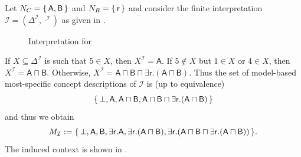 \begin{Example}
  \label{expl:no-minimality}
  Let $N_C = {\{\, \mathsf{A}, \mathsf{B} \,\}}$ and $N_R = {\{\, \mathsf{r} \,\}}$ and consider
  the finite interpretation $\mathcal{I} = (\Delta^{\mathcal{I}}, \cdot^{\mathcal{I}})$ as
  given in .

  \begin{figure}[tp]
    \centering
    \caption{Interpretation for }
    \label{fig:no-minimality}
  \end{figure}

  If $X \subseteq \Delta^{\mathcal{I}}$ is such that $5 \in X$, then $X^{\mathcal{I}} =
  \mathsf{A}$.  If $5 \notin X$ but $1 \in X$ or $4 \in X$, then $X^{\mathcal{I}} =
  \mathsf{A} \sqcap \mathsf{B}$.  Otherwise, $X^{\mathcal{I}} = \mathsf{A \sqcap B \sqcap
    \exists r.(A \sqcap B)}$.  Thus the set of model-based most-specific concept
  descriptions of $\mathcal{I}$ is (up to equivalence)
  \begin{equation*}
    {\ensuremath{\{\, \bot, \mathsf{A}, \mathsf{A \sqcap B}, \mathsf{A \sqcap B \sqcap \exists
        r.(A \sqcap B)} \,\}}}
  \end{equation*}
  and thus we obtain
  \begin{equation*}
    M_{\mathcal{I}} := {\{\, \bot, \mathsf{A}, \mathsf{B}, \mathsf{\exists r. A},
      \mathsf{\exists r. (A \sqcap B)}, \mathsf{\exists r. (A \sqcap B \sqcap \exists
        r. (A \sqcap B))} \,\}}.
  \end{equation*}
  The induced context is shown in .


\end{Example}
